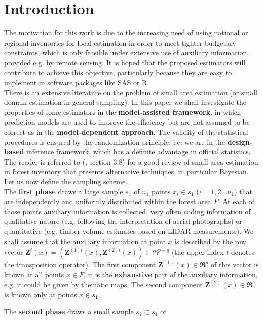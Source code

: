 \documentclass[a4paper,12pt,leqno, titlepage]{article}
\begin{document}
\section{Introduction}\label{introduction}
 \setcounter{page}{1}
The motivation for this work is due to the increasing need of using national or regional inventories for local estimation in order to meet tighter budgetary constraints, which is only feasible under extensive use of auxiliary information, provided e.g. by remote sensing. It is hoped that the proposed estimators will contribute to achieve this objective, particularly because they are easy to implement in software packages like SAS or R.\\
There is an extensive literature on the problem of small area estimation (or small domain estimation in general sampling). In this paper we shall investigate the properties of some estimators in the \textbf{model-assisted framework}, in which prediction models are used to improve the efficiency but are not assumed to be correct as in the \textbf{model-dependent approach}. The validity of the statistical procedures is ensured by the randomization principle: i.e. we are in the \textbf{design-based} inference framework, which has a definite advantage in official statistics. The reader is referred to (\cite{koehl}, section 3.8) for a good review of small-area estimation in forest inventory that presents alternative techniques, in particular Bayesian. Let us now define the sampling scheme.\\
The \textbf{first phase} draws a large sample $s_1$ of $n_1$ points
$x_{i}\in{s_1}$ ($i=1,2\ldots n_1$) that are independently and uniformly distributed
within the forest area $F$. At each of those points auxiliary
information is collected, very often coding information of qualitative nature
(e.g. following the  interpretation of aerial photographs) or quantitative (e.g. timber volume estimates  based on LIDAR measurements). We shall assume that the auxiliary information at point $x$
is described by the row vector $\pmb{Z}^t(x)=(\pmb{Z}^{(1)t}(x),\pmb{Z}^{(2)t}(x))\in{\Re^{p+q}}$ (the upper index $t$ denotes the transposition operator). The first component $\pmb{Z}^{(1)}(x)\in{\Re^{p}}$ of this vector is known at all points $x\in{F}$, it is the \textbf{exhaustive} part of the auxiliary information, e.g. it could be given by thematic maps. The second component $\pmb{Z}^{(2)}(x)\in{\Re}^q$ is known only at points $x\in{s}_1$.\par
 The \textbf{second phase} draws a small sample $s_2\subset{s_1}$ of
\end{document}
